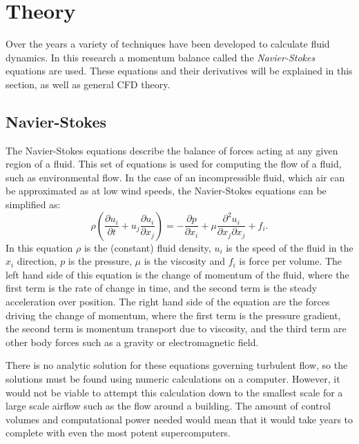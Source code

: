 \section{Theory}
\label{theory}

Over the years a variety of techniques have been developed to calculate fluid dynamics. In this research a momentum balance called the \emph{Navier-Stokes} equations are used. These equations and their derivatives will be explained in this section, as well as general CFD theory. 

\subsection{Navier-Stokes}

The Navier-Stokes equations describe the balance of forces acting at any given region of a fluid. This set of equations is used for computing the flow of a fluid, such as environmental flow. In the case of an incompressible fluid, which air can be approximated as at low wind speeds, the Navier-Stokes equations can be simplified as:
\begin{equation}\label{eq:NS}
\rho \left( \frac{\partial u_i}{\partial t} + u_j \frac{\partial u_i}{\partial x_j} \right) = -\frac{\partial p}{\partial x_i} + \mu \frac{\partial^2 u_i}{\partial x_j \partial x_j} + f_i. 
\end{equation} 
In this equation $\rho$ is the (constant) fluid density, $u_i$ is the speed of the fluid in the $x_i$ direction, $p$ is the pressure, $\mu$ is the viscosity and $f_i$ is force per volume. The left hand side of this equation is the change of momentum of the fluid, where the first term is the rate of change in time, and the second term is the steady acceleration over position. The right hand side of the equation are the forces driving the change of momentum, where the first term is the pressure gradient, the second term is momentum transport due to viscosity, and the third term are other body forces such as a gravity or electromagnetic field.

There is no analytic solution for these equations governing turbulent flow, so the solutions must be found using numeric calculations on a computer. However, it would not be viable to attempt this calculation down to the smallest scale for a large scale airflow such as the flow around a building. The amount of control volumes and computational power needed would mean that it would take years to complete with even the most potent supercomputers. 

